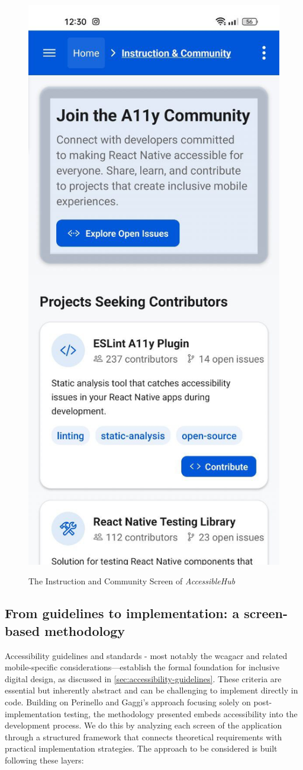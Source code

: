 \begin{enumerate}
\begin{figure}[ht]
\centering
\includegraphics[width=0.4\linewidth, alt={Screenshot of the Instruction and Community Screen of AccessibleHub}]{img/instruction-community.jpg}
\caption{The Instruction and Community Screen of \textit{AccessibleHub}}\label{fig:instruction-community}
\end{figure}
    
\end{enumerate}

\pagebreak

\subsection{From guidelines to implementation: a screen-based methodology}

Accessibility guidelines and standards - most notably the \acrshort{wcagacr}  and related mobile-specific considerations—establish the formal foundation for inclusive digital design, as discussed in \ref{sec:accessibility-guidelines}. These criteria are essential but inherently abstract and can be challenging to implement directly in code. Building on Perinello and Gaggi's approach focusing solely on post-implementation testing, the methodology presented embeds accessibility into the development process. We do this by analyzing each screen of the application through a structured framework that connects theoretical requirements with practical implementation strategies. The approach to be considered is built following these layers:

